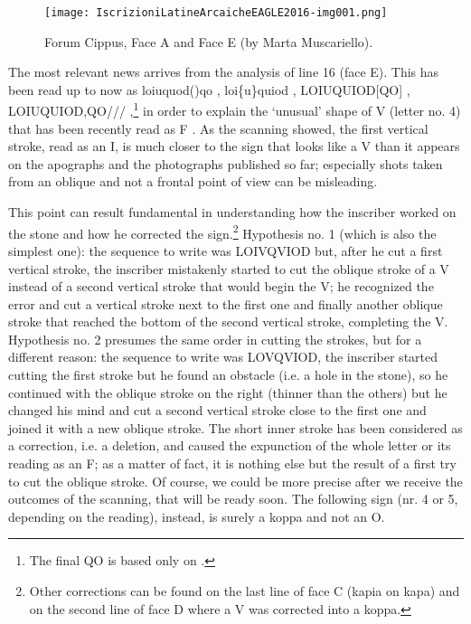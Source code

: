 \documentclass[amsthm,ebook]{saparticle}
\begin{document}
\begin{figure}[!bp]
\centering
 \texttt{[image: IscrizioniLatineArcaicheEAGLE2016-img001.png]}
\caption{Forum Cippus, Face A and Face E (by Marta Muscariello).}
\label{fig:1}
\end{figure}





The most relevant news arrives from the analysis of line 16 (face E). This has been read up to now as loiuquod()qo
\citep{wachter_altlateinische_1987}, loi\{u\}quiod \citep{_studies_1993}, LOIUQUIOD[QO] \citep{baldi_foundations_2002}, LOIUQUIOD,QO/// \citep{hartmann_fruhlateinischen_2005},\footnote{The
final QO is based only on \citet{goidanich_rapporti_1943}.} in order to explain the `unusual' shape of V (letter no. 4) that has
been recently read as F \citep{prosdocimi_roma_2010}. As the scanning showed, the first vertical stroke, read as an I, is much
closer to the sign that looks like a V than it appears on the apographs and the photographs published so far;
especially shots taken from an oblique and not a frontal point of view can be misleading. 

This point can result fundamental in understanding how the inscriber worked on the stone and how he corrected the
sign.\footnote{Other corrections can be found on the last line of face C (kapia on kapa) and on the second line of face
D where a V was corrected into a koppa. } Hypothesis no. 1 (which is also the simplest one): the sequence to write was
LOIVQVIOD but, after he cut a first vertical stroke, the inscriber mistakenly started to cut the oblique stroke of a V
instead of a second vertical stroke that would begin the V; he recognized the error and cut a vertical stroke next to
the first one and finally another oblique stroke that reached the bottom of the second vertical stroke, completing the
V. Hypothesis no. 2 presumes the same order in cutting the strokes, but for a different reason: the sequence to write
was LOVQVIOD, the inscriber started cutting the first stroke but he found an obstacle (i.e. a hole in the stone), so he
continued with the oblique stroke on the right (thinner than the others) but he changed his mind and cut a second
vertical stroke close to the first one and joined it with a new oblique stroke. The short inner stroke has been
considered as a correction, i.e. a deletion, and caused the expunction of the whole letter or its reading as an F; as a
matter of fact, it is nothing else but the result of a first try to cut the oblique stroke. Of course, we could be more
precise after we receive the outcomes of the scanning, that will be ready soon. The following sign (nr. 4 or 5,
depending on the reading), instead, is surely a koppa and not an O.
\end{document}
